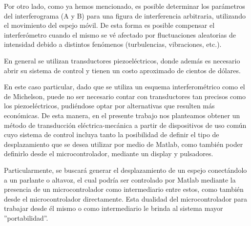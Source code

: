 Por otro lado, como ya hemos mencionado, es posible determinar los parámetros del interferograma (A y B) para una figura de interferencia arbitraria, utilizando el movimiento del espejo móvil. De esta forma es posible compensar el interferómetro cuando el mismo se vé afectado por fluctuaciones aleatorias de intensidad debido a distintos fenómenos (turbulencias, vibraciones, etc.).

En general se utilizan transductores piezoeléctricos, donde además es necesario abrir su sistema de control y tienen un costo aproximado de cientos de dólares.

En este caso particular, dado que se utiliza un esquema interferométrico como el de Michelson, puede no ser necesario contar con transductores tan precisos como los piezoeléctricos, pudiéndose optar por alternativas que resulten más económicas.
De esta manera, en el presente trabajo nos planteamos obtener un método de transducción eléctrica-mecánica a partir de dispositivos de uso común cuyo sistema de control incluya tanto la posibilidad de definir el tipo de desplazamiento que se desea utilizar por medio de Matlab, como también poder definirlo desde el microcontrolador, mediante un display y pulsadores.

Particularmente, se buscará generar el desplazamiento de un espejo conectándolo a un parlante o altavoz, el cual podría ser controlado por Matlab mediante la presencia de un microcontrolador como intermediario entre estos, como también desde el microcontrolador directamente. Esta dualidad del microcontrolador para trabajar desde él mismo o como intermediario le brinda al sistema mayor ''portabilidad''.